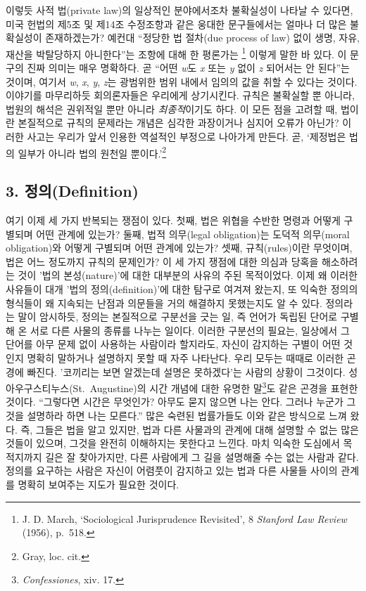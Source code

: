 \documentclass[12pt, oneside]{book}  %
\begin{document}
이렇듯 사적 법(private law)의 일상적인 분야에서조차 불확실성이 나타날 수
있다면, 미국 헌법의 제5조 및 제14조 수정조항과 같은 웅대한 문구들에서는
얼마나 더 많은 불확실성이 존재하겠는가? 예컨대 ``정당한 법 절차(due
process of law) 없이 생명, 자유, 재산을 박탈당하지 아니한다''는 조항에
대해 한 평론가는 \footnote{J. D. March, `Sociological Jurisprudence
  Revisited', 8 \emph{Stanford Law Review} (1956), p.~518.} 이렇게 말한
바 있다. 이 문구의 진짜 의미는 매우 명확하다. 곧 ``어떤 \emph{w}도
\emph{x} 또는 \emph{y} 없이 \emph{z} 되어서는 안 된다''는 것이며, 여기서
\emph{w}, \emph{x}, \emph{y}, \emph{z}는 광범위한 범위 내에서 임의의
값을 취할 수 있다는 것이다. 이야기를 마무리하듯 회의론자들은 우리에게
상기시킨다. 규칙은 불확실할 뿐 아니라, 법원의 해석은 권위적일 뿐만
아니라 \emph{최종적}이기도 하다. 이 모든 점을 고려할 때, 법이란
본질적으로 규칙의 문제라는 개념은 심각한 과장이거나 심지어 오류가
아닌가? 이러한 사고는 우리가 앞서 인용한 역설적인 부정으로 나아가게
만든다. 곧, `제정법은 법의 일부가 아니라 법의 원천일 뿐이다.'\footnote{Gray,
  loc. cit.}

\subsection{\texorpdfstring{\textbf{3.
정의(Definition)}}{3. 정의(Definition)}}\label{uxc815uxc758definition}

여기 이제 세 가지 반복되는 쟁점이 있다. 첫째, 법은 위협을 수반한 명령과
어떻게 구별되며 어떤 관계에 있는가? 둘째, 법적 의무(legal obligation)는
도덕적 의무(moral obligation)와 어떻게 구별되며 어떤 관계에 있는가?
셋째, 규칙(rules)이란 무엇이며, 법은 어느 정도까지 규칙의 문제인가? 이
세 가지 쟁점에 대한 의심과 당혹을 해소하려는 것이 '법의 본성(nature)'에
대한 대부분의 사유의 주된 목적이었다. 이제 왜 이러한 사유들이 대개 '법의
정의(definition)'에 대한 탐구로 여겨져 왔는지, 또 익숙한 정의의 형식들이
왜 지속되는 난점과 의문들을 거의 해결하지 못했는지도 알 수 있다.
정의라는 말이 암시하듯, 정의는 본질적으로 구분선을 긋는 일, 즉 언어가
독립된 단어로 구별해 온 서로 다른 사물의 종류를 나누는 일이다. 이러한
구분선의 필요는, 일상에서 그 단어를 아무 문제 없이 사용하는 사람이라
할지라도, 자신이 감지하는 구별이 어떤 것인지 명확히 말하거나 설명하지
못할 때 자주 나타난다. 우리 모두는 때때로 이러한 곤경에 빠진다.
'코끼리는 보면 알겠는데 설명은 못하겠다'는 사람의 상황이 그것이다. 성
아우구스티누스(St.~Augustine)의 시간 개념에 대한 유명한 말\footnote{\emph{Confessiones},
  xiv. 17.}도 같은 곤경을 표현한 것이다. ``그렇다면 시간은 무엇인가?
아무도 묻지 않으면 나는 안다. 그러나 누군가 그것을 설명하라 하면 나는
모른다.'' 많은 숙련된 법률가들도 이와 같은 방식으로 느껴 왔다. 즉,
그들은 법을 알고 있지만, 법과 다른 사물과의 관계에 대해 설명할 수 없는
많은 것들이 있으며, 그것을 완전히 이해하지는 못한다고 느낀다. 마치
익숙한 도심에서 목적지까지 길은 잘 찾아가지만, 다른 사람에게 그 길을
설명해줄 수는 없는 사람과 같다. 정의를 요구하는 사람은 자신이 어렴풋이
감지하고 있는 법과 다른 사물들 사이의 관계를 명확히 보여주는 지도가
필요한 것이다.
\end{document}

